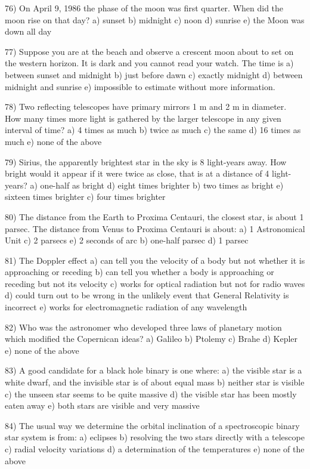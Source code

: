 76) On April 9, 1986 the phase of the moon was first quarter.
When did the moon rise on that day?
a) sunset b) midnight c) noon d) sunrise
e) the Moon was down all day

77) Suppose you are at the beach and observe a crescent moon about to set
on the western horizon. It is dark and you cannot read your watch.
The time is
a) between sunset and midnight b) just before dawn
c) exactly midnight d) between midnight and sunrise
e) impossible to estimate without more information.

78) Two reflecting telescopes have primary mirrors 1 m and 2 m in diameter.
How many times more light is gathered by the larger telescope in any
given interval of time?
a) 4 times as much b) twice as much c) the same d) 16 times as much
e) none of the above

79) Sirius, the apparently brightest star in the sky is 8 light-years away.
How bright would it appear if it were twice as close, that is at a distance
of 4 light-years?
a) one-half as bright d) eight times brighter
b) two times as bright e) sixteen times brighter
c) four times brighter

80) The distance from the Earth to Proxima Centauri, the closest star, is about
1 parsec. The distance from Venus to Proxima Centauri is about:
a) 1 Astronomical Unit c) 2 parsecs e) 2 seconds of arc
b) one-half parsec d) 1 parsec

81) The Doppler effect
a) can tell you the velocity of a body but not whether it is approaching
or receding
b) can tell you whether a body is approaching or receding but not its
velocity
c) works for optical radiation but not for radio waves
d) could turn out to be wrong in the unlikely event that General Relativity
is incorrect
e) works for electromagnetic radiation of any wavelength

82) Who was the astronomer who developed three laws of planetary motion
which modified the Copernican ideas?
a) Galileo b) Ptolemy c) Brahe d) Kepler e) none of the above

83) A good candidate for a black hole binary is one where:
a) the visible star is a white dwarf, and the invisible star is
of about equal mass
b) neither star is visible
c) the unseen star seems to be quite massive
d) the visible star has been mostly eaten away
e) both stars are visible and very massive

84) The usual way we determine the orbital inclination of a spectroscopic
binary star system is from:
a) eclipses b) resolving the two stars directly with a telescope
c) radial velocity variations d) a determination of the temperatures
e) none of the above

